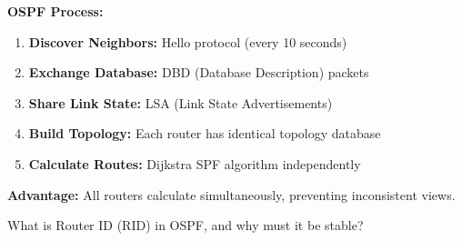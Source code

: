 \documentclass[12pt,a4paper]{article}
\begin{document}
\begin{abox}
\textbf{OSPF Process:}

\begin{enumerate}
    \item \textbf{Discover Neighbors:} Hello protocol (every 10 seconds)
    \item \textbf{Exchange Database:} DBD (Database Description) packets
    \item \textbf{Share Link State:} LSA (Link State Advertisements)
    \item \textbf{Build Topology:} Each router has identical topology database
    \item \textbf{Calculate Routes:} Dijkstra SPF algorithm independently
\end{enumerate}

\textbf{Advantage:} All routers calculate simultaneously, preventing inconsistent views.
\end{abox}


\begin{qbox}{What is Router ID (RID) in OSPF, and why must it be stable?}
\end{qbox}
\end{document}
